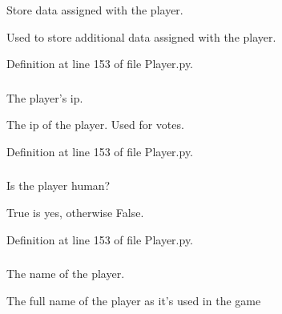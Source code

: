 \-Store data assigned with the player. 

\-Used to store additional data assigned with the player. 

\-Definition at line 153 of file \-Player.\-py.

\hypertarget{class_player_1_1_player_ae8a044ac39cb2e15fa997be7c952e9ee}{
\subsubsection[{ip}]{}}
\label{class_player_1_1_player_ae8a044ac39cb2e15fa997be7c952e9ee}


\-The player's ip. 

\-The ip of the player. \-Used for votes. 

\-Definition at line 153 of file \-Player.\-py.

\hypertarget{class_player_1_1_player_aa327e78afb312eb9d1f19be92757f589}{
\subsubsection[{is\-\_\-human}]{}}
\label{class_player_1_1_player_aa327e78afb312eb9d1f19be92757f589}


\-Is the player human? 

\-True is yes, otherwise \-False. 

\-Definition at line 153 of file \-Player.\-py.

\hypertarget{class_player_1_1_player_ae853b8b89526c79fe230c69678d62495}{
\subsubsection[{name}]{}}
\label{class_player_1_1_player_ae853b8b89526c79fe230c69678d62495}


\-The name of the player. 

\-The full name of the player as it's used in the game 

